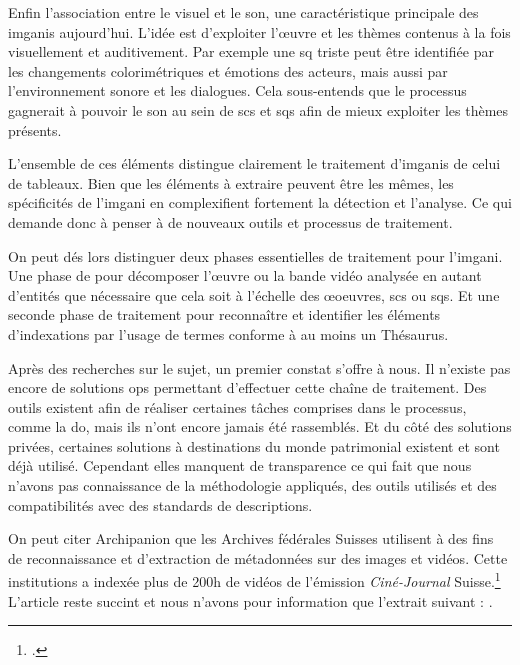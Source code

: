 Enfin l'association entre le visuel et le son, une caractéristique principale des \glspl{imgani} aujourd'hui. L'idée est d'exploiter l'\oe{uvre} et les thèmes contenus à la fois visuellement et auditivement. Par exemple une \gls{sq} triste peut être identifiée par les changements colorimétriques et émotions des acteurs, mais aussi par l'environnement sonore et les dialogues. Cela sous-entends que le processus gagnerait à pouvoir  le son au sein de \glspl{sc} et \glspl{sq} afin de mieux exploiter les thèmes présents.

L'ensemble de ces éléments distingue clairement le traitement d'\glspl{imgani} de celui de tableaux. Bien que les éléments à extraire peuvent être les mêmes, les spécificités de l'\gls{imgani} en complexifient fortement la détection et l'analyse. Ce qui demande donc à penser à de nouveaux outils et processus de traitement.\newline

On peut dés lors distinguer deux phases essentielles de traitement pour l'\gls{imgani}. Une phase de  pour décomposer l'\oe{uvre} ou la bande vidéo analysée en autant d'entités que nécessaire que cela soit à l'échelle des \oe{oeuvres}, \glspl{sc} ou \glspl{sq}. Et une seconde phase de traitement pour reconnaître et identifier les éléments d'indexations par l'usage de termes conforme à au moins un Thésaurus. 

Après des recherches sur le sujet, un premier constat s'offre à nous. Il n'existe pas encore de solutions \gls{ops} permettant d'effectuer cette chaîne de traitement. Des outils existent afin de réaliser certaines tâches comprises dans le processus, comme la \gls{do}, mais ils n'ont encore jamais été rassemblés. Et du côté des solutions privées, certaines solutions à destinations du monde patrimonial existent et sont déjà utilisé. Cependant elles manquent de transparence ce qui fait que nous n'avons pas connaissance de la méthodologie appliqués, des outils utilisés et des compatibilités avec des standards de descriptions.

On peut citer Archipanion que les Archives fédérales Suisses utilisent à des fins de reconnaissance et d'extraction de métadonnées sur des images et vidéos. Cette institutions a indexée plus de 200h de vidéos de l'émission \textit{Ciné-Journal} Suisse.\footcite{ArchipanionPourCineJournal} L'article reste succint et nous n'avons pour information que l'extrait suivant : . 

